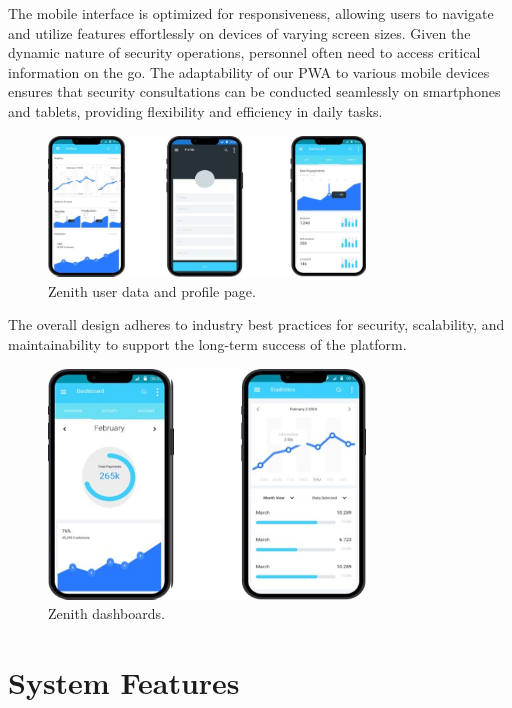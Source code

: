 \documentclass{scrreprt}
\begin{document}
The mobile interface is optimized for responsiveness, allowing users to navigate and utilize features effortlessly on devices of varying screen sizes. Given the dynamic nature of security operations, personnel often need to access critical information on the go. The adaptability of our PWA to various mobile devices ensures that security consultations can be conducted seamlessly on smartphones and tablets, providing flexibility and efficiency in daily tasks.
\newline

    \begin{figure}[h!]
      \centering
      \includegraphics[width=0.75\textwidth]{mockups2.png}
      \caption{Zenith user data and profile page.}
    \end{figure}
    
The overall design adheres to industry best practices for security, scalability, and maintainability to support the long-term success of the platform.
\newline

    \begin{figure}[h!]
      \centering
      \includegraphics[width=0.75\textwidth]{mockups3.png}
      \caption{Zenith dashboards.}
    \end{figure}

\chapter{System Features}
\end{document}
